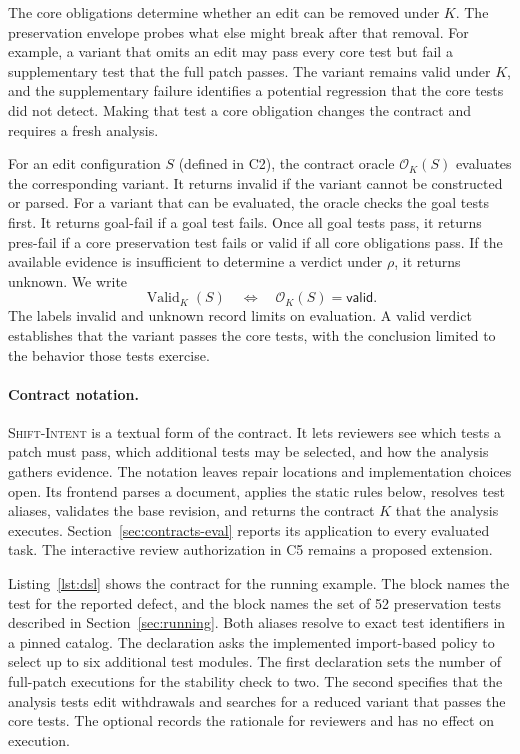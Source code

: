 \documentclass[a4paper,fleqn]{cas-sc}
\newcommand{\dsl}{\textsc{Shift-Intent}}
\newcommand{\code}[1]{\texttt{\detokenize{#1}}}
\newcommand{\lab}[1]{\textsf{#1}}
\newcommand{\Valid}{\operatorname{Valid}}
\begin{document}
The core obligations determine whether an edit can be removed under $K$. The preservation envelope probes what else might break after that removal. For example, a variant that omits an edit may pass every core test but fail a supplementary test that the full patch passes. The variant remains valid under $K$, and the supplementary failure identifies a potential regression that the core tests did not detect. Making that test a core obligation changes the contract and requires a fresh analysis.

For an edit configuration $S$ (defined in C2), the contract oracle $\mathcal{O}_K(S)$ evaluates the corresponding variant. It returns \lab{invalid} if the variant cannot be constructed or parsed. For a variant that can be evaluated, the oracle checks the goal tests first. It returns \lab{goal-fail} if a goal test fails. Once all goal tests pass, it returns \lab{pres-fail} if a core preservation test fails or \lab{valid} if all core obligations pass. If the available evidence is insufficient to determine a verdict under $\rho$, it returns \lab{unknown}. We write \begin{equation} \Valid_K(S)\quad\Longleftrightarrow\quad \mathcal{O}_K(S)=\lab{valid}. \label{eq:valid} \end{equation} The labels \lab{invalid} and \lab{unknown} record limits on evaluation. A \lab{valid} verdict establishes that the variant passes the core tests, with the conclusion limited to the behavior those tests exercise.



\paragraph{Contract notation.} \dsl{} is a textual form of the contract. It lets reviewers see which tests a patch must pass, which additional tests may be selected, and how the analysis gathers evidence. The notation leaves repair locations and implementation choices open. Its frontend parses a document, applies the static rules below, resolves test aliases, validates the base revision, and returns the contract $K$ that the analysis executes. Section~\ref{sec:contracts-eval} reports its application to every evaluated task. The interactive review authorization in C5 remains a proposed extension.

Listing~\ref{lst:dsl} shows the contract for the running example. The \code{goal} block names the test for the reported defect, and the \code{preserve} block names the set of 52 preservation tests described in Section~\ref{sec:running}. Both aliases resolve to exact test identifiers in a pinned catalog. The \code{envelope} declaration asks the implemented import-based policy to select up to six additional test modules. The first \code{evidence} declaration sets the number of full-patch executions for the stability check to two. The second specifies that the analysis tests edit withdrawals and searches for a reduced variant that passes the core tests. The optional \code{note} records the rationale for reviewers and has no effect on execution.
\end{document}
